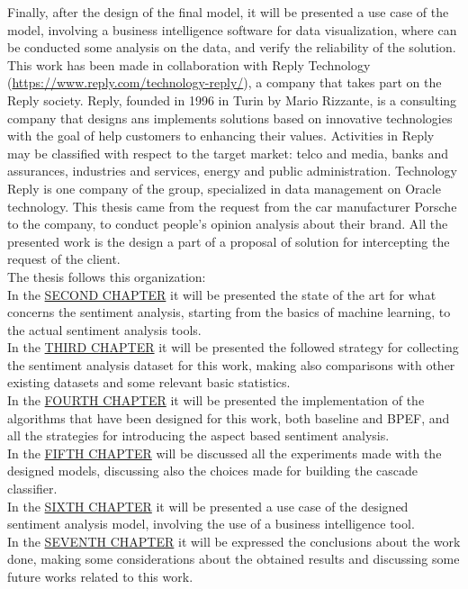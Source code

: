 Finally, after the design of the final model, it will be presented a use case of the model, involving a business intelligence software for data visualization, where can be conducted some analysis on the data, and verify the reliability of the solution.\\
This work has been made in collaboration with Reply Technology (\url{https://www.reply.com/technology-reply/}), a company that takes part on the Reply society. Reply, founded in 1996 in Turin by Mario Rizzante, is a consulting company that designs ans implements solutions based on innovative technologies with the goal of help customers to enhancing their values. Activities in Reply may be classified with respect to the target market: telco and media, banks and assurances, industries and services, energy and public administration. Technology Reply is one company of the group, specialized in data management on Oracle technology. This thesis came from the request from the car manufacturer Porsche to the company, to conduct people's opinion analysis about their brand. All the presented work is the design a part of a proposal of solution for intercepting the request of the client.\\
The thesis follows this organization:\\
In the \hyperref[state-of-the-art]{\textcolor[RGB]{35,103,148}{SECOND CHAPTER}} it will be presented the state of the art for what concerns the sentiment analysis, starting from the basics of machine learning, to the actual sentiment analysis tools.\\
In the \hyperref[dataset]{\textcolor[RGB]{35,103,148}{THIRD CHAPTER}} it will be presented the followed strategy for collecting the sentiment analysis dataset for this work, making also comparisons with other existing datasets and some relevant basic statistics.\\
In the \hyperref[algorithms]{\textcolor[RGB]{35,103,148}{FOURTH CHAPTER}} it will be presented the implementation of the algorithms that have been designed for this work, both baseline and \ac{BPEF}, and all the strategies for introducing the aspect based sentiment analysis.\\
In the \hyperref[experiments]{\textcolor[RGB]{35,103,148}{FIFTH CHAPTER}} will be discussed all the experiments made with the designed models, discussing also the choices made for building the cascade classifier.\\
In the \hyperref[industrial-use-case]{\textcolor[RGB]{35,103,148}{SIXTH CHAPTER}} it will be presented a use case of the designed sentiment analysis model, involving the use of a business intelligence tool.\\
In the \hyperref[conclusion]{\textcolor[RGB]{35,103,148}{SEVENTH CHAPTER}} it will be expressed the conclusions about the work done, making some considerations about the obtained results and discussing some future works related to this work.\\

